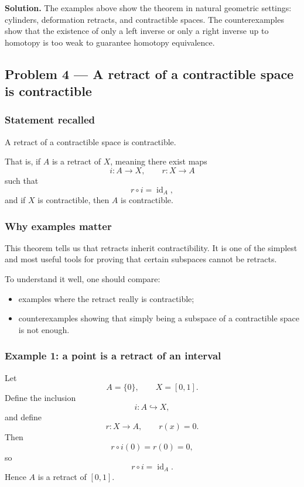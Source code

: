 \documentclass[12pt,a4paper]{article}
\theoremstyle{notespace}
\begin{document}
\textbf{Solution.}
The examples above show the theorem in natural geometric settings: cylinders, deformation retracts, and contractible spaces. The counterexamples show that the existence of only a left inverse or only a right inverse up to homotopy is too weak to guarantee homotopy equivalence.

\subsection{Problem 4 --- A retract of a contractible space is contractible}

\subsubsection{Statement recalled}

A retract of a contractible space is contractible.

That is, if \(A\) is a retract of \(X\), meaning there exist maps
\[
i:A\to X,
\qquad
r:X\to A
\]
such that
\[
r\circ i=\operatorname{id}_A,
\]
and if \(X\) is contractible, then \(A\) is contractible.

\subsubsection{Why examples matter}

This theorem tells us that retracts inherit contractibility. It is one of the simplest and most useful tools for proving that certain subspaces cannot be retracts.

To understand it well, one should compare:

\begin{itemize}
	\item examples where the retract really is contractible;
	\item counterexamples showing that simply being a subspace of a contractible space is not enough.
\end{itemize}

\subsubsection{Example 1: a point is a retract of an interval}

Let
\[
A=\{0\},
\qquad
X=[0,1].
\]
Define the inclusion
\[
i:A\hookrightarrow X,
\]
and define
\[
r:X\to A,
\qquad
r(x)=0.
\]
Then
\[
r\circ i(0)=r(0)=0,
\]
so
\[
r\circ i=\operatorname{id}_A.
\]
Hence \(A\) is a retract of \([0,1]\).
\end{document}
